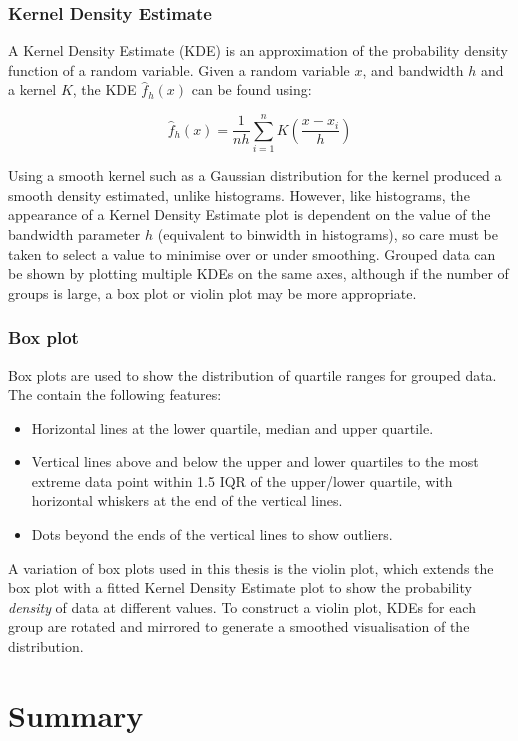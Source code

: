 \subsubsection{Kernel Density Estimate}

A Kernel Density Estimate (KDE) is an approximation of the probability
density function of a random variable. Given a random variable $x$,
and bandwidth $h$ and a kernel $K$, the KDE $\hat{f}_h(x)$ can be
found using:

\begin{equation}
  \hat{f}_h(x) = \frac{1}{nh} \sum^{n}_{i=1} K\left( \frac{x - x_i}{h} \right)
\end{equation}

Using a smooth kernel such as a Gaussian distribution for the kernel
produced a smooth density estimated, unlike histograms. However, like
histograms, the appearance of a Kernel Density Estimate plot is
dependent on the value of the bandwidth parameter $h$ (equivalent to
binwidth in histograms), so care must be taken to select a value to
minimise over or under smoothing. Grouped data can be shown by
plotting multiple KDEs on the same axes, although if the number of
groups is large, a box plot or violin plot may be more appropriate.


\subsubsection{Box plot}

Box plots are used to show the distribution of quartile ranges for
grouped data. The contain the following features:

\begin{itemize}
\item Horizontal lines at the lower quartile, median and upper
  quartile.
\item Vertical lines above and below the upper and lower quartiles to
  the most extreme data point within 1.5 IQR of the upper/lower
  quartile, with horizontal whiskers at the end of the vertical lines.
\item Dots beyond the ends of the vertical lines to show outliers.
\end{itemize}

A variation of box plots used in this thesis is the violin plot, which
extends the box plot with a fitted Kernel Density Estimate plot to
show the probability \emph{density} of data at different values. To
construct a violin plot, KDEs for each group are rotated and mirrored
to generate a smoothed visualisation of the distribution.


\section{Summary}
